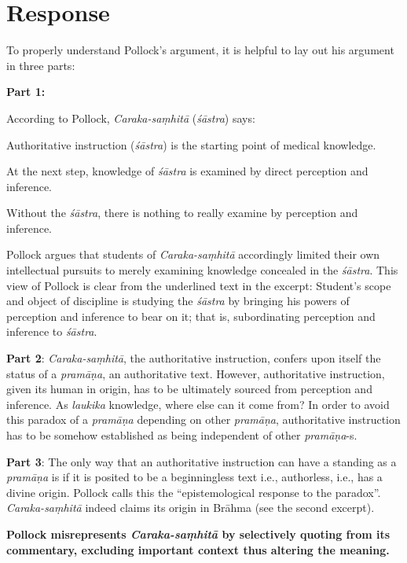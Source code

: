 \section*{Response}

To properly understand Pollock's argument, it is helpful to lay out his argument in three parts:

{\bf Part 1:}

According to Pollock, {\sl Caraka-saṃhitā} ({\sl śāstra}) says:
\begin{myquote}
Authoritative instruction ({\sl śāstra}) is the starting point of medical knowledge. 

At the next step, knowledge of {\sl śāstra} is examined by direct perception and inference.

Without the {\sl śāstra}, there is nothing to really examine by perception and inference.  
\end{myquote}

Pollock argues that students of {\sl Caraka-saṃhitā} accordingly limited their own intellectual pursuits to merely examining knowledge concealed in the {\sl śāstra}.  This view of Pollock is clear from the underlined text in the excerpt: Student's scope and object of discipline is studying the {\sl śāstra} by bringing his powers of perception and inference to bear on it; that is, subordinating perception and inference to {\sl śāstra}.

{\bf Part 2}: {\sl Caraka-saṃhitā}, the authoritative instruction, confers upon itself the status of a {\sl pramāṇa}, an authoritative text.  However, authoritative instruction, given its human in origin, has to be ultimately sourced from perception and inference.  As {\sl laukika} knowledge, where else can it come from? In order to avoid this paradox of a {\sl pramāṇa} depending on other {\sl pramāṇa}, authoritative instruction has to be somehow established as being independent of other {\sl pramāṇa}-s.

{\bf Part 3}: The only way that an authoritative instruction can have a standing as a {\sl pramāṇa} is if it is posited to be a beginningless text i.e., authorless, i.e., has a divine origin.  Pollock calls this the ``epistemological response to the paradox''. {\sl Caraka-saṃhitā} indeed claims its origin in Brāhma (see the second excerpt).

{\bf Pollock misrepresents {{\sl\bfseries Caraka-saṃhitā}\relax} by selectively quoting from its commentary, excluding important context thus altering the meaning.}

